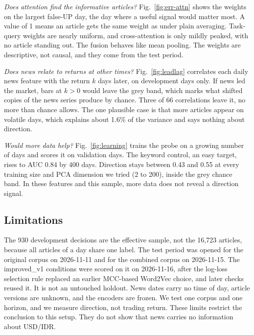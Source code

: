 \emph{Does attention find the informative articles?} Fig.~\ref{fig:err-attn} shows the weights on the largest false-UP day, the day where a useful signal would matter most. A value of 1 means an article gets the same weight as under plain averaging. Task-query weights are nearly uniform, and cross-attention is only mildly peaked, with no article standing out. The fusion behaves like mean pooling. The weights are descriptive, not causal, and they come from the test period.



\emph{Does news relate to returns at other times?} Fig.~\ref{fig:leadlag} correlates each daily news feature with the return $k$ days later, on development days only. If news led the market, bars at $k>0$ would leave the grey band, which marks what shifted copies of the news series produce by chance. Three of 66 correlations leave it, no more than chance allows. The one plausible case is that more articles appear on volatile days, which explains about 1.6\% of the variance and says nothing about direction.



\emph{Would more data help?} Fig.~\ref{fig:learning} trains the probe on a growing number of days and scores it on validation days. The keyword control, an easy target, rises to AUC 0.84 by 400 days. Direction stays between 0.43 and 0.55 at every training size and PCA dimension we tried (2 to 200), inside the grey chance band. In these features and this sample, more data does not reveal a direction signal.




\subsection{Limitations}
The 930 development decisions are the effective sample, not the 16{,}723 articles, because all articles of a day share one label. The test period was opened for the original corpus on 2026-11-11 and for the combined corpus on 2026-11-15. The improved\_v1 conditions were scored on it on 2026-11-16, after the log-loss selection rule replaced an earlier MCC-based Word2Vec choice, and later checks reused it. It is not an untouched holdout. News dates carry no time of day, article versions are unknown, and the encoders are frozen. We test one corpus and one horizon, and we measure direction, not trading return. These limits restrict the conclusion to this setup. They do not show that news carries no information about USD/IDR.
